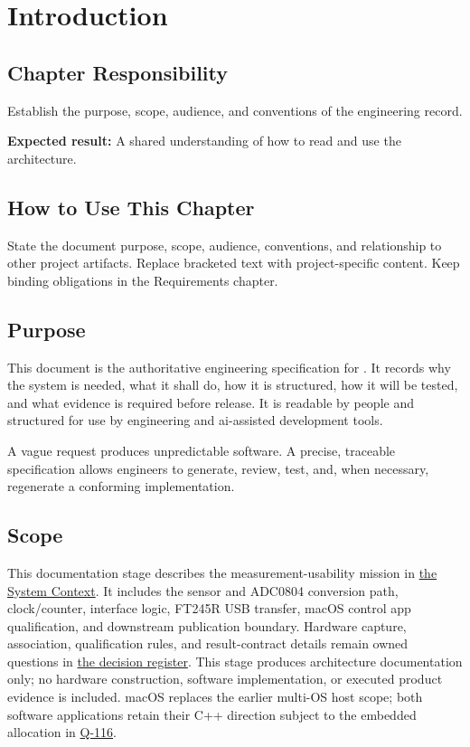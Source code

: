 \chapter{Introduction}

\section{Chapter Responsibility}
\label{Section:IntroductionResponsibility}
Establish the purpose, scope, audience, and conventions of the engineering record.

\noindent\textbf{Expected result:} A shared understanding of how to read and use the architecture.

\section{How to Use This Chapter}
State the document purpose, scope, audience, conventions, and relationship to
other project artifacts. Replace bracketed text with project-specific content.
Keep binding obligations in the Requirements chapter.

\section{Purpose}
This document is the authoritative engineering specification for
\ProjectName. It records why the system is needed, what it shall do, how it is
structured, how it will be tested, and what evidence is required before
release. It is readable by people and structured for use by engineering and
\gls{ai}-assisted development tools.

\begin{mbsNote}
A vague request produces unpredictable software. A precise, traceable
specification allows engineers to generate, review, test, and, when necessary,
regenerate a conforming implementation.
\end{mbsNote}

\section{Scope}
This documentation stage describes the measurement-usability mission in \hyperref[Section:MeasurementMission]{the System Context}. It includes the sensor and ADC0804 conversion path, clock/counter, interface logic, FT245R USB transfer, macOS control app qualification, and downstream publication boundary. Hardware capture, association, qualification rules, and result-contract details remain owned questions in \hyperref[Table:OwnedQuestions]{the decision register}. This stage produces architecture documentation only; no hardware construction, software implementation, or executed product evidence is included. macOS replaces the earlier multi-OS host scope; both software applications retain their C++ direction subject to the embedded allocation in \hyperref[Question:Q-116]{Q-116}.

